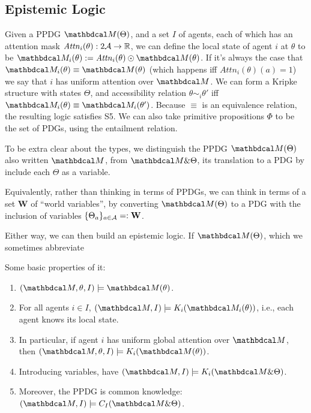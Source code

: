 \subsection{Epistemic Logic}
            
    Given a PPDG $\dg M(\Theta)$, 
    and a set $I$ of agents, each of which has an attention mask
        $\mathit{Attn}_i(\theta) : 2\mathcal A \to \mathbb R$, 
        we can define the local state of agent $i$ at $\theta$ to be $\dg M_i(\theta) := \mathit{Attn}_i(\theta) \odot \dg M(\theta)$. 
    If it's always the case that $\dg M_i(\theta) \equiv \dg M(\theta)$ (which happens iff $\mathit{Attn}_i(\theta)(a) = 1$) we say that $i$ has uniform attention over $\dg M$.   
    We can form a Kripke structure
    with states $\Theta$, and accessibility relation 
    $\theta  \sim_i \theta'$ iff $\dg M_i(\theta) \equiv \dg M_i(\theta')$.
    Because $\equiv$ is an equivalence relation, the resulting logic satisfies S5. 
    We can also take primitive propositions $\Phi$ to be the set of PDGs, using the entailment relation.

To be extra clear about the types, we distinguish the PPDG $\dg M(\Theta)$ also written $\dg M$,
    from $\dg M\& \Theta$, its translation to a PDG by include each $\Theta$ as a variable.
    
{\color{gray}Equivalently, rather than thinking in terms of PPDGs, 
we can think in terms of a set $\mathbf W$ of ``world variables'',
by converting $\dg M(\Theta)$ to a PDG with the inclusion of variables $\{\Theta_a \}_{a \in \mathcal A} =: \mathbf W$.
}

Either way, we can then build an epistemic logic.  If $\dg M(\Theta)$,
which we sometimes abbreviate

Some basic properties of it:
\begin{prop}
    \begin{enumerate}[parsep=0pt]
    \item $ (\dg M, \theta, I) \models \dg M(\theta)$.
    \item For all agents $i \in I$, 
        $(\dg M, I) \models K_i ( \dg M_i(\theta) )$, i.e., each agent
            knows its local state. 
    \item In particular, if agent $i$ has uniform global attention over $\dg M$, then 
        $(\dg M, \theta, I) \models K_i (\dg M(\theta))$.
    \item Introducing variables,  have $(\dg M, I) \models K_i (\dg M \& \Theta)$.
    \item Moreover, the PPDG is common knowledge: $(\dg M, I) \models C_{I} (\dg M \& \Theta)$.
    \end{enumerate}
\end{prop}


